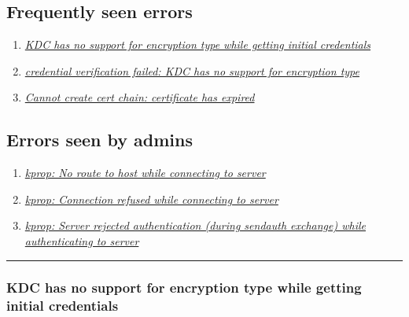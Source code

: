 \documentclass[letterpaper,10pt,english]{sphinxmanual}
\begin{document}
\subsection{Frequently seen errors}
\label{admin/troubleshoot:frequently-seen-errors}\begin{enumerate}
\item {} 
{\hyperref[admin/troubleshoot:init-creds-etype-nosupp]{\emph{KDC has no support for encryption type while getting initial credentials}}}

\item {} 
{\hyperref[admin/troubleshoot:cert-chain-etype-nosupp]{\emph{credential verification failed: KDC has no support for encryption type}}}

\item {} 
{\hyperref[admin/troubleshoot:err-cert-chain-cert-expired]{\emph{Cannot create cert chain: certificate has expired}}}

\end{enumerate}


\subsection{Errors seen by admins}
\label{admin/troubleshoot:errors-seen-by-admins}\label{admin/troubleshoot:prop-failed-start}\begin{enumerate}
\item {} 
{\hyperref[admin/troubleshoot:kprop-no-route]{\emph{kprop: No route to host while connecting to server}}}

\item {} 
{\hyperref[admin/troubleshoot:kprop-con-refused]{\emph{kprop: Connection refused while connecting to server}}}

\item {} 
{\hyperref[admin/troubleshoot:kprop-sendauth-exchange]{\emph{kprop: Server rejected authentication (during sendauth exchange) while authenticating to server}}}

\end{enumerate}
\label{admin/troubleshoot:prop-failed-end}

\bigskip\hrule{}\bigskip



\subsubsection{KDC has no support for encryption type while getting initial credentials}
\label{admin/troubleshoot:kdc-has-no-support-for-encryption-type-while-getting-initial-credentials}\label{admin/troubleshoot:init-creds-etype-nosupp}
\end{document}
